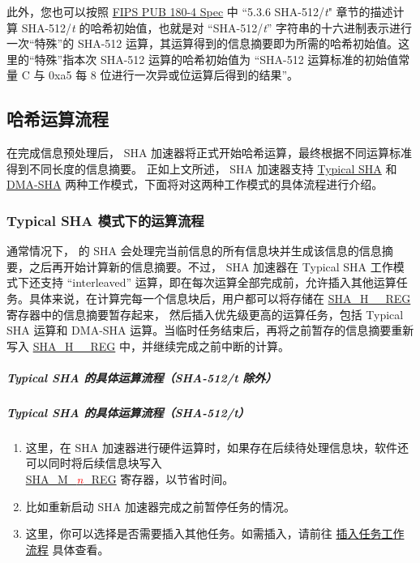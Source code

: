 \documentclass[main\_\_CN.tex]{subfiles}
\begin{document}
此外，您也可以按照 \href{https://doi.org/10.6028/NIST.FIPS.180-4}{FIPS PUB 180-4 Spec} 中 ``5.3.6 SHA-512/{\it{t}}" 章节的描述计算 SHA-512/{\it{t}} 的哈希初始值，也就是对 “SHA-512/{\it{t}}” 字符串的十六进制表示进行一次“特殊”的 SHA-512 运算，其运算得到的信息摘要即为所需的哈希初始值。这里的“特殊”指本次 SHA-512 运算的哈希初始值为 “SHA-512 运算标准的初始值常量 C 与 0x{}a5 每 8 位进行一次异或位运算后得到的结果”。

\subsection{哈希运算流程}\label{sec:sha-hash-operation}

在完成信息预处理后，\chipname{} SHA 加速器将正式开始哈希运算，最终根据不同运算标准得到不同长度的信息摘要。
正如上文所述，\chipname{} SHA 加速器支持 \hyperref[sec:sha-typical-sha]{Typical SHA} 和 \hyperref[sec:sha-dma-sha]{DMA-SHA} 两种工作模式，下面将对这两种工作模式的具体流程进行介绍。

\subsubsection{Typical SHA 模式下的运算流程}\label{sec:sha-typical-sha}

通常情况下，\chipname{} 的 SHA 会处理完当前信息的所有信息块并生成该信息的信息摘要，之后再开始计算新的信息摘要。不过，\chipname{} SHA 加速器在 Typical SHA 工作模式下还支持 “interleaved” 运算，即在每次运算全部完成前，允许插入其他运算任务。具体来说，在计算完每一个信息块后，用户都可以将存储在 \hyperref[regdesc:SHAHNREG]{SHA\_H\_\_REG} 寄存器中的信息摘要暂存起来， 然后插入优先级更高的运算任务，包括 Typical SHA 运算和 DMA-SHA 运算。当临时任务结束后，再将之前暂存的信息摘要重新写入 \hyperref[regdesc:SHAHNREG]{SHA\_H\_\_REG} 中，并继续完成之前中断的计算。

\subparagraph{Typical SHA 的具体运算流程（SHA-512/{\it{t}} 除外）}

    

\subparagraph{Typical SHA 的具体运算流程（SHA-512/{\it{t}}）}

    

\begin{tiplisting}\label{others:sha-note-typical-sha}
\vspace{-2.5em}
\begin{enumerate}
\item 这里，在 SHA 加速器进行硬件运算时，如果存在后续待处理信息块，软件还可以同时将后续信息块写入 \\ \hyperref[regdesc:SHAMNREG]{SHA\_M\_\textcolor{red}{\it{n}}\_REG} 寄存器，以节省时间。
\item 比如重新启动 SHA 加速器完成之前暂停任务的情况。
\item 这里，你可以选择是否需要插入其他任务。如需插入，请前往 \hyperref[others:sha-interleaved]{插入任务工作流程} 具体查看。
\end{enumerate}
\end{tiplisting}
\end{document}
